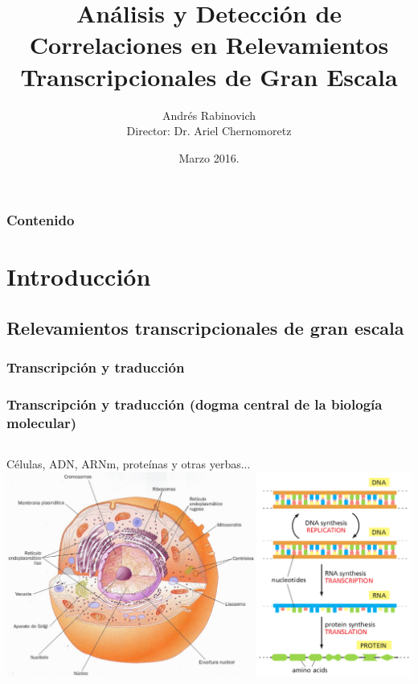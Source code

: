 \documentclass[serif,9pt, t]{beamer}
\newif\ifplacelogo %
\begin{document}
\title[Análisis y Detección de Correlaciones en Relevamien\ldots ]{Análisis y Detección de Correlaciones en Relevamientos Transcripcionales de Gran Escala}  
\author[Andrés Rabinovich]{Andrés Rabinovich\\{\small Director: Dr. Ariel Chernomoretz}}

\date{Marzo 2016.}


\begin{frame}
\titlepage
\end{frame}

\placelogofalse

\begin{frame}\frametitle{Contenido}
\tableofcontents
\end{frame} 

\section{Introducción} 


\subsection{Relevamientos transcripcionales de gran escala}

\subsubsection*{Transcripción y traducción}
\begin{frame}\frametitle{Transcripción y traducción (dogma central de la biología molecular)}
\begin{columns}
    \column{\dimexpr\paperwidth-10pt}
	\centering 
	Células, ADN, ARNm, proteínas y otras yerbas...\\
	\bigskip
	\includegraphics[width=1\textwidth]{celula_y_adn}
\end{columns}
\end{frame}
\end{document}
